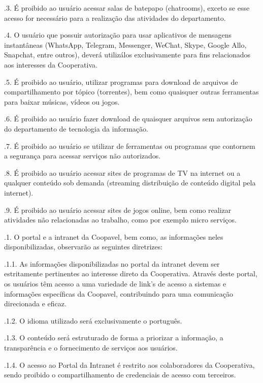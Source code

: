 \documentclass[a4paper,10pt,portuges]{sphinxmanual}
\begin{document}
.3. É proibido ao usuário acessar salas de bate\sphinxhyphen{}papo (chatrooms), exceto se esse acesso for necessário para a realização das atividades do departamento.

.4. O usuário que possuir autorização para usar aplicativos de mensagens instantâneas (WhatsApp, Telegram, Messenger, WeChat, Skype, Google Allo, Snapchat, entre outros), deverá utilizá\sphinxhyphen{}los exclusivamente para fins relacionados aos interesses da Cooperativa.

.5. É proibido ao usuário, utilizar programas para download de arquivos de compartilhamento por tópico (torrentes), bem como quaisquer outras ferramentas para baixar músicas, vídeos ou jogos.

.6. É proibido ao usuário fazer download de quaisquer arquivos sem autorização do departamento de tecnologia da informação.

.7. É proibido ao usuário se utilizar de ferramentas ou programas que contornem a segurança para acessar serviços não autorizados.

.8. É proibido ao usuário acessar sites de programas de TV na internet ou a qualquer conteúdo sob demanda (streaming \sphinxhyphen{} distribuição de conteúdo digital pela internet).

.9. É proibido ao usuário acessar sites de jogos online, bem como realizar atividades não relacionadas ao trabalho, como por exemplo micro serviços.

.1. O portal e a intranet da Coopavel, bem como, as informações neles disponibilizadas, observarão as seguintes diretrizes:

.1.1. As informações disponibilizadas no portal da intranet devem ser estritamente pertinentes ao interesse direto da Cooperativa. Através deste portal, os usuários têm acesso a uma variedade de link’s de acesso a sistemas e informações específicas da Coopavel, contribuindo para uma comunicação direcionada e eficaz.

.1.2. O idioma utilizado será exclusivamente o português.

.1.3. O conteúdo será estruturado de forma a priorizar a informação, a transparência e o fornecimento de serviços aos usuários.

.1.4. O acesso ao Portal da Intranet é restrito aos colaboradores da Cooperativa, sendo proibido o compartilhamento de credenciais de acesso com terceiros.
\end{document}
